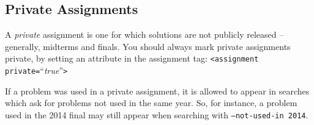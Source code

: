   \subsection{Private Assignments}
    A \textit{private} assignment is one for which solutions are not publicly
    released -- generally, midterms and finals. You should always mark
    private assignments private, by setting an attribute in the assignment tag: 
    \texttt{<assignment private=}``\textit{true}''\texttt{>}
    
    If a problem was used in a private assignment, it is allowed to appear
    in searches which ask for problems not used in the same year. So, for
    instance, a problem used in the 2014 final may still appear when
    searching with \texttt{--not-used-in 2014}. 